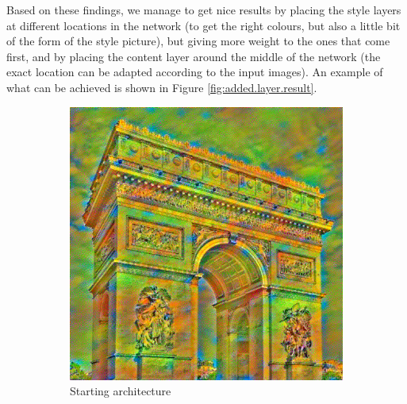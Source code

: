 \documentclass[twocolumn,superscriptaddress,aps,floatfix, nofootinbib]{revtex4-1}
\begin{document}
    Based on these findings, we manage to get nice results by placing the style layers at different locations in the network (to get the right colours, but also a little bit of the form of the style picture), but giving more weight to the ones that come first, and by placing the content layer around the middle of the network (the exact location can be adapted according to the input images). An example of what can be achieved is shown in Figure \ref{fig:added.layer.result}. 
    
    \begin{figure}[ht]
        \centering
        \begin{subfigure}[b]{0.22\textwidth}
            \centering
            \includegraphics[width=\textwidth]{resources/png/layers/layers_default.png}
            \caption{Starting architecture}
        \end{subfigure}
        \hfill
        \begin{subfigure}[b]{0.22\textwidth}
            \centering

\end{subfigure}
\end{figure}
\end{document}
